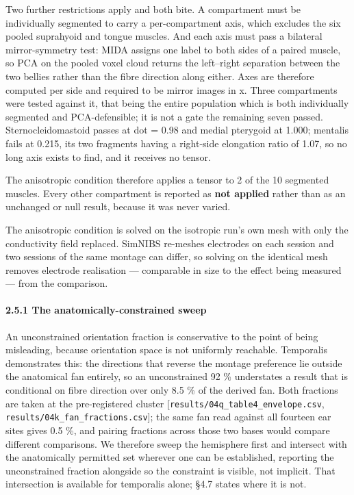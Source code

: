 \documentclass[
  11pt,
  a4paper,
]{article}
\begin{document}
Two further restrictions apply and both bite. A compartment must be individually
segmented to carry a per-compartment axis, which excludes the six pooled
suprahyoid and tongue muscles. And each axis must pass a bilateral
mirror-symmetry test: MIDA assigns one label to both sides of a paired muscle,
so PCA on the pooled voxel cloud returns the left--right separation between the
two bellies rather than the fibre direction along either. Axes are therefore
computed per side and required to be mirror images in x. Three compartments were
tested against it, that being the entire population which is both individually
segmented and PCA-defensible; it is not a gate the remaining seven passed.
Sternocleidomastoid
passes at \textbar dot\textbar{} = 0.98 and medial pterygoid at 1.000; mentalis fails at 0.215,
its two fragments having a right-side elongation ratio of 1.07, so no long axis
exists to find, and it receives no tensor.

The anisotropic condition therefore applies a tensor to 2 of the 10 segmented
muscles. Every other compartment is reported as \textbf{not applied} rather than as
an unchanged or null result, because it was never varied.

The anisotropic condition is solved on the isotropic run's own mesh with only
the conductivity field replaced. SimNIBS re-meshes electrodes on each session
and two sessions of the same montage can differ, so solving on the identical
mesh removes electrode realisation --- comparable in size to the effect being
measured --- from the comparison.

\paragraph{2.5.1 The anatomically-constrained sweep}\label{the-anatomically-constrained-sweep}

An unconstrained orientation fraction is conservative to the point of being
misleading, because orientation space is not uniformly reachable. Temporalis
demonstrates this: the directions that reverse the montage preference lie
outside the anatomical fan entirely, so an unconstrained 92 \% understates a
result that is conditional on fibre direction over only 8.5 \% of the derived
fan. Both fractions are taken at the pre-registered cluster
{[}\texttt{results/04q\_table4\_envelope.csv}, \texttt{results/04k\_fan\_fractions.csv}{]}; the same
fan read against all fourteen ear sites gives 0.5 \%, and pairing fractions
across those two bases would compare different comparisons. We therefore sweep
the hemisphere first and intersect with the anatomically permitted set wherever
one can be established, reporting the unconstrained fraction alongside so the
constraint is visible, not implicit. That intersection is available for
temporalis alone; §4.7 states where it is not.
\end{document}
